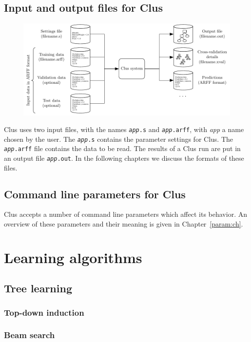 \documentclass[a4paper]{report}
\begin{document}
\section{Input and output files for Clus}

\begin{figure}
\includegraphics{fig/clusinout}
\end{figure}

Clus uses two input files, with the names {\tt {\em app}.s} and {\tt {\em app}.arff}, with {\em app} a name chosen by the user.  The {\tt {\em app}.s} contains the parameter settings for Clus.  The {\tt {\em app}.arff} file contains the data to be read.  The results of a Clus run are put in an output file {\tt {\em app}.out}.  In the following chapters we discuss the formats of these files.

\section{Command line parameters for Clus}

Clus accepts a number of command line parameters which affect its behavior.  An overview of these parameters and their meaning is given in Chapter~\ref{param:ch}.

\chapter{Learning algorithms}

\section{Tree learning}

\subsection{Top-down induction}

\subsection{Beam search}
\end{document}
